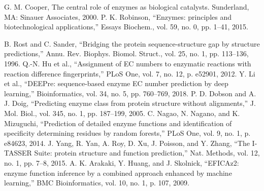 \documentclass[conference]{IEEEtran}
\begin{document}
\begin{thebibliography}{00}
 G. M. Cooper, The central role of enzymes as biological catalysts. Sunderland, MA: Sinauer Associates, 2000.
 P. K. Robinson, “Enzymes: principles and biotechnological applications,” Essays Biochem., vol. 59, no. 0, pp. 1–41, 2015.

 B. Rost and C. Sander, “Bridging the protein sequence-structure gap by structure predictions,” Annu. Rev. Biophys. Biomol. Struct., vol. 25, no. 1, pp. 113–136, 1996.
 Q.-N. Hu et al., “Assignment of EC numbers to enzymatic reactions with reaction difference fingerprints,” PLoS One, vol. 7, no. 12, p. e52901, 2012.
 Y. Li et al., “DEEPre: sequence-based enzyme EC number prediction by deep learning,” Bioinformatics, vol. 34, no. 5, pp. 760–769, 2018.
 P. D. Dobson and A. J. Doig, “Predicting enzyme class from protein structure without alignments,” J. Mol. Biol., vol. 345, no. 1, pp. 187–199, 2005.
C. Nagao, N. Nagano, and K. Mizuguchi, “Prediction of detailed enzyme functions and identification of specificity determining residues by random forests,” PLoS One, vol. 9, no. 1, p. e84623, 2014.
J. Yang, R. Yan, A. Roy, D. Xu, J. Poisson, and Y. Zhang, “The I-TASSER Suite: protein structure and function prediction,” Nat. Methods, vol. 12, no. 1, pp. 7–8, 2015.
A. K. Arakaki, Y. Huang, and J. Skolnick, “EFICAz2: enzyme function inference by a combined approach enhanced by machine learning,” BMC Bioinformatics, vol. 10, no. 1, p. 107, 2009.


\end{thebibliography}
\end{document}
